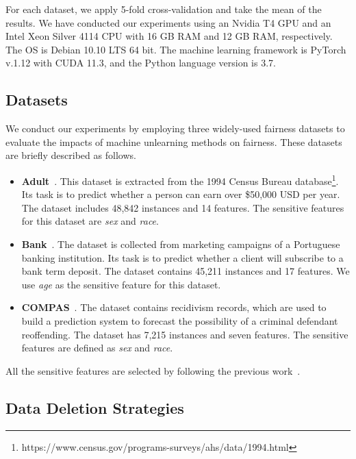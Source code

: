 For each dataset, we apply 5-fold cross-validation and take the mean of the results. We have conducted our experiments using an Nvidia T4 GPU and an Intel Xeon Silver 4114 CPU with 16 GB RAM and 12 GB RAM, respectively. The OS is Debian 10.10 LTS 64 bit. The machine learning framework is PyTorch v.1.12 with CUDA 11.3, and the Python language version is 3.7. 


\subsection{Datasets}
\label{sec:data}



We conduct our experiments by employing three widely-used fairness datasets to evaluate the impacts of machine unlearning methods on fairness. These datasets are briefly described as follows. 

\begin{itemize} [leftmargin=*]
    \item \textbf{Adult}~\cite{adult}. This dataset is extracted from the 1994 Census Bureau database\footnote{https://www.census.gov/programs-surveys/ahs/data/1994.html}. Its task is to predict whether a person can earn over \$50,000 USD per year. The dataset includes 48,842 instances and 14 features. The sensitive features for this dataset are \textit{sex} and \textit{race}. 
    \item \textbf{Bank}~\cite{bank}. The dataset is collected from marketing campaigns of a Portuguese banking institution. Its task is to predict whether a client will subscribe to a bank term deposit. The dataset contains 45,211 instances and 17 features. We use \textit{age} as the sensitive feature for this dataset.
    \item \textbf{COMPAS}~\cite{compas}. The dataset contains recidivism records, which are used to build a prediction system to forecast the possibility of a criminal defendant reoffending. The dataset has 7,215 instances and seven features. The sensitive features are defined as \textit{sex} and \textit{race}.
\end{itemize}

All the sensitive features are selected by following the previous work~\cite{biswas2020machine, chakraborty2020fairway, zhang2021ignorance}.



 

\subsection{Data Deletion Strategies}
\label{sec:data_deletion}

